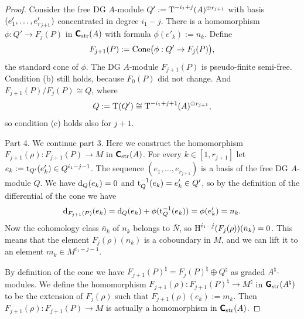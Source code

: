 \begin{proof}
Consider the free DG $A$-module 
$Q' := \operatorname{T}^{-i_1 + j}(A)^{\oplus r_{j + 1}}$
with basis $(e'_1, \ldots, \lb e'_{r_{j + 1}})$ concentrated in degree 
$i_1 - j$. There is a homomorphism 
$\phi : Q' \to F_{j}(P)$ in $\boldsymbol{\mathsf{C}}_{\mathrm{str}}(A)$
with formula $\phi(e'_k) := n_k$. Define 
\begin{equation} \label{eqn:4755}
F_{j + 1}(P) := \operatorname{Cone} \bigl( \phi : Q' \to F_{j}(P) \bigr) , 
\end{equation}
the standard cone of $\phi$. 
The DG $A$-module $F_{j + 1}(P)$ is pseudo-finite semi-free.
Condition (b) still holds, because $F_{0}(P)$ did not change. And 
$F_{j + 1}(P) / F_{j}(P) \cong Q$, where 
\begin{equation} \label{eqn:4760}
Q := \operatorname{T}(Q') \cong \operatorname{T}^{-i_1 + j + 1}(A)^{\oplus r_{j + 1}} , 
\end{equation}
so condition (c) holds also for $j + 1$. 

\medskip \noindent
Part 4. We continue part 3. Here we construct the 
homomorphism 
$F_{j + 1}(\rho) : F_{j + 1}(P) \to M$
in $\boldsymbol{\mathsf{C}}_{\mathrm{str}}(A)$. 
For every $k \in [1, r_{j + 1}]$ let 
$e_k := \operatorname{t}_{Q'}(e'_k) \in Q^{i_1 - j - 1}$.
The sequence $(e_1, \ldots, e_{r_{j + 1}})$ is a basis of the free DG 
$A$-module $Q$. 
We have $\mathrm{d}_Q(e_k) = 0$ and $\operatorname{t}^{-1}_{Q}(e_k) = e'_k \in Q'$, 
so by the definition of the differential of the cone we have 
\[ \mathrm{d}_{F_{j + 1}(P)}(e_k) = \mathrm{d}_Q(e_k) + \phi(\operatorname{t}^{-1}_{Q}(e_k)) = 
\phi(e'_k) = n_k . \]
Now the cohomology class $\bar{n}_k$ of $n_k$ belongs to $\bar{N}$,
so 
$\operatorname{H}^{i_1 - j}(F_j(\rho))(\bar{n}_k) = 0$.
This means that the element 
$F_j(\rho)(n_k)$ is a coboundary in $M$, and we can lift it to an element 
$m_k \in M^{i_1 - j - 1}$.

By definition of the cone we have
$F_{j + 1}(P)^{\natural} = F_{j}(P)^{\natural} \oplus Q^{\natural}$ 
as graded $A^{\natural}$-modules.
We define the homomorphism 
$F_{j + 1}(\rho) : F_{j + 1}(P)^{\natural} \to M^{\natural}$ 
in $\boldsymbol{\mathsf{G}}_{\mathrm{str}}(A^{\natural})$
to be the extension of $F_{j}(\rho)$ such that 
$F_{j + 1}(\rho)(e_k) := m_k$. Then 
$F_{j + 1}(\rho) : F_{j + 1}(P) \to M$ 
is actually a homomorphism in $\boldsymbol{\mathsf{C}}_{\mathrm{str}}(A)$. 
         

\end{proof}
